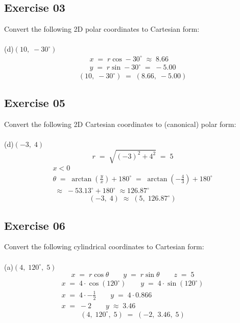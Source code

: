 \documentclass[12pt, a4paper]{article}
\begin{document}
\subsection*{Exercise 03}
Convert the following 2D polar coordinates
to Cartesian form:\\\\
	(d)\quad $(10,\;-30^\circ)$
		\begin{gather}
			\tag*{}
			x\;=\;r\cos-30^\circ \;\approx\; 8.66\\
			\tag*{}
			y\;=\;r\sin-30^\circ \;=\; -5.00
		\end{gather}
		\begin{equation}
			\tag{Cartesian form}
				(10,\;-30^\circ)\;=\;(8.66,\;-5.00)
		\end{equation}
		
\subsection*{Exercise 05}
Convert the following 2D Cartesian coordinates to
(canonical) polar form:\\\\
	(d)\quad$(-3,\;4)$
		\begin{equation}
			\tag*{}
				r\;=\;\sqrt{(-3)^2+4^2}\;=\;5
		\end{equation}
		\begin{gather}
			\tag*{}
				x < 0\\
			\tag*{}
				\theta\;=\;
				\arctan\left(\frac{y}{x}\right)+180^\circ\;=\;
				\arctan\left(-\frac{4}{3}\right)+180^\circ\\
			\tag*{}
				\;\approx\;-53.13^\circ+180^\circ
				\;\approx126.87^\circ
		\end{gather}
		\begin{equation}
			\tag*{}
				(-3,\;4)\;\approx\;(5,\;126.87^\circ)
		\end{equation}
		
\newpage\quad
\subsection*{Exercise 06}
Convert the following cylindrical coordinates to
Cartesian form:\\\\
	(a)\quad$(4,\;120^\circ,\;5)$
		\begin{equation}
			\tag*{}
				x\;=\;r\cos\theta\qquad y\;=\;
				r\sin\theta\qquad z\;=\;5
		\end{equation}
		\begin{gather}
			\tag*{}
				x\;=\;4\cdot\cos(120^\circ)\qquad
				y\;=\;4\cdot\sin(120^\circ)\\
			\tag*{}
				x\;=\;4\cdot-\frac{1}{2}\qquad
				y\;=\;4\cdot0.866\\
			\tag*{}
				x\;=\;-2 \qquad y\;\approx\;3.46
		\end{gather}
		\begin{equation}
			\tag*{}
				(4,\;120^\circ,\;5)\;=\;(-2,\;3.46,\;5)
		\end{equation}
	
\end{document}
